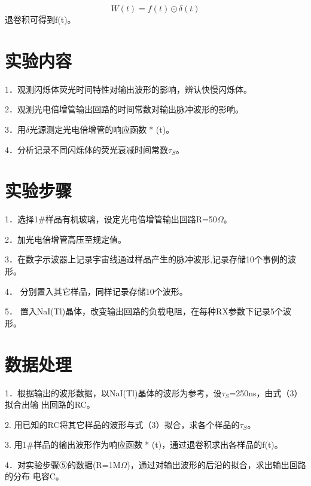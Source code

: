 \documentclass{article}
\begin{document}
	\begin{equation}
		W(t)=f(t)\odot\delta(t)
	\end{equation}
退卷积可得到f(t)。
	\section{实验内容}
	1．观测闪烁体荧光时间特性对输出波形的影响，辨认快慢闪烁体。
	
	
	2．观测光电倍增管输出回路的时间常数对输出脉冲波形的影响。
	
	
	3．用$\delta$光源测定光电倍增管的响应函数* (t)。
	
	
	4．分析记录不同闪烁体的荧光衰减时间常数$ \tau_S $。
	\section{实验步骤}
	1．选择1$ \# $样品有机玻璃，设定光电倍增管输出回路R=50$ \Omega $。
	
	
	2．加光电倍增管高压至规定值。
	
	
	3．在数字示波器上记录宇宙线通过样品产生的脉冲波形,记录存储10个事例的波形。
	
	
	4． 分别置入其它样品，同样记录存储10个波形。
	
	
	5． 置入NaI(Tl)晶体，改变输出回路的负载电阻，在每种RX参数下记录5个波形。
	

	\section{数据处理}
	1．根据输出的波形数据，以NaI(Tl)晶体的波形为参考，设$ \tau_S $=250ns，由式（3）拟合出输
	出回路的RC。
	
	
	2. 用已知的RC将其它样品的波形与式（3）拟合，求各个样品的$ \tau_S $。


	3. 用1$ \# $样品的输出波形作为响应函数* (t)，通过退卷积求出各样品的f(t)。
	
	
	4．对实验步骤⑤的数据(R=1M$ \Omega $)，通过对输出波形的后沿的拟合，求出输出回路的分布
	电容C。
\end{document}
